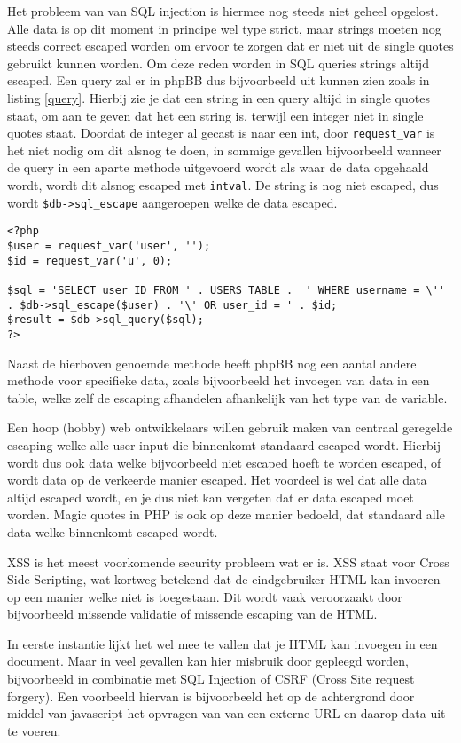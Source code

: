 Het probleem van van SQL injection is hiermee nog steeds niet geheel opgelost. Alle data is op dit moment in principe wel type strict, maar strings moeten nog steeds correct escaped worden om ervoor te zorgen dat er niet uit de single quotes gebruikt kunnen worden. Om deze reden worden in SQL queries strings altijd escaped. Een query zal er in phpBB dus bijvoorbeeld uit kunnen zien zoals in listing \ref{query}. Hierbij zie je dat een string in een query altijd in single quotes staat, om aan te geven dat het een string is, terwijl een integer niet in single quotes staat. Doordat de integer al gecast is naar een int, door \texttt{request\_var} is het niet nodig om dit alsnog te doen, in sommige gevallen bijvoorbeeld wanneer de query in een aparte methode uitgevoerd wordt als waar de data opgehaald wordt, wordt dit alsnog escaped met \texttt{intval}. De string is nog niet escaped, dus wordt \texttt{\$db->sql\_escape} aangeroepen welke de data escaped. 
\begin{lstlisting}[label=query,caption=Query uitvoeren in phpBB]
<?php
$user = request_var('user', '');
$id = request_var('u', 0);

$sql = 'SELECT user_ID FROM ' . USERS_TABLE .  ' WHERE username = \'' . $db->sql_escape($user) . '\' OR user_id = ' . $id;
$result = $db->sql_query($sql);
?>
\end{lstlisting}%
Naast de hierboven genoemde methode heeft phpBB nog een aantal andere methode voor specifieke data, zoals bijvoorbeeld het invoegen van data in een table, welke zelf de escaping afhandelen afhankelijk van het type van de variable.

Een hoop (hobby) web ontwikkelaars willen gebruik maken van centraal geregelde escaping welke alle user input die binnenkomt standaard escaped wordt. Hierbij wordt dus ook data welke bijvoorbeeld niet escaped hoeft te worden escaped, of wordt data op de verkeerde manier escaped. Het voordeel is wel dat alle data altijd escaped wordt, en je dus niet kan vergeten dat er data escaped moet worden. Magic quotes in PHP is ook op deze manier bedoeld, dat standaard alle data welke binnenkomt escaped wordt.

XSS is het meest voorkomende security probleem wat er is. XSS staat voor Cross Side Scripting, wat kortweg betekend dat de eindgebruiker HTML kan invoeren op een manier welke niet is toegestaan. Dit wordt vaak veroorzaakt door bijvoorbeeld missende validatie of missende escaping van de HTML.

In eerste instantie lijkt het wel mee te vallen dat je HTML kan invoegen in een document. Maar in veel gevallen kan hier misbruik door gepleegd worden, bijvoorbeeld in combinatie met SQL Injection of CSRF (Cross Site request forgery). Een voorbeeld hiervan is bijvoorbeeld het op de achtergrond door middel van javascript het opvragen van van een externe URL en daarop data uit te voeren.

